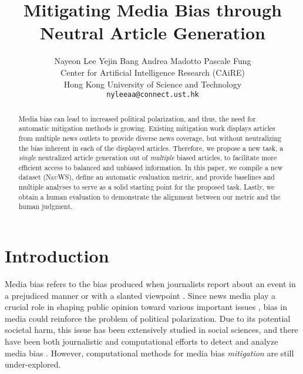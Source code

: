 \documentclass[11pt,a4paper]{article}
\title{Mitigating Media Bias through Neutral Article Generation}
\author{
Nayeon Lee \quad Yejin Bang \quad Andrea Madotto \quad Pascale Fung \\
Center for Artificial Intelligence Research (CAiRE) \\
Hong Kong University of Science and Technology \\
\texttt {nyleeaa@connect.ust.hk} \\
}
\newcommand{\ourdata}{{\scshape NeuWS}}
\begin{document}
\maketitle
\begin{abstract}
Media bias can lead to increased political polarization, and thus, the need for automatic mitigation methods is growing. 
Existing mitigation work displays articles from multiple news outlets to provide diverse news coverage, but without neutralizing the bias inherent in each of the displayed articles. 
Therefore, we propose a new task, a \textit{single} neutralized article generation out of \textit{multiple} biased articles, to facilitate more efficient access to balanced and unbiased information.
In this paper, we compile a new dataset (\ourdata), define an automatic evaluation metric, and provide baselines and multiple analyses to serve as a solid starting point for the proposed task. Lastly, we obtain a human evaluation to demonstrate the alignment between our metric and the human judgment. 
\end{abstract}




\section{Introduction}
Media bias refers to the bias produced when journalists report about an event in a prejudiced manner or with a slanted viewpoint \cite{gentzkow2006media}. Since news media play a crucial role in shaping public opinion toward various important issues
\cite{de2004effects, mccombs2009news, perse2016media}, bias in media could reinforce the problem of political polarization. 
Due to its potential societal harm, this issue has been extensively studied in social sciences, and there have been both journalistic and computational efforts to detect and analyze media bias \cite{entman1993framing,groseclose2005measure,recasens2013linguistic}. However, computational methods for media bias \textit{mitigation} are still under-explored.
\end{document}
